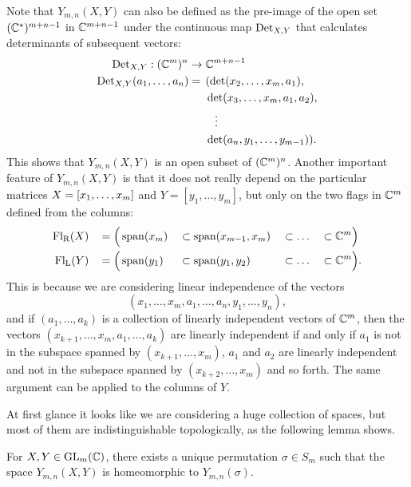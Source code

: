 Note that $Y_{m,n}(X,Y)$ can also be defined as the
pre-image of the open set $(\mathbb{C}^*)^{m+n-1}$ in $\mathbb{C}^{m+n-1}$ under the
continuous map $\operatorname{Det}_{X,Y}$ that calculates determinants of subsequent
vectors:
\begin{align*}
  \operatorname{Det}_{X,Y} : (\mathbb{C}^m)^n \to &\;\mathbb{C}^{m+n-1} \\
  \operatorname{Det}_{X,Y}(a_1,\dots,a_n) = \,&\; (\det(x_2,\dots,x_m,a_1),\\
  &\; \det(x_3,\dots,x_m,a_1,a_2), \\
  &\;\;\;\; \vdots\\
  &\; \det(a_n,y_1,\dots,y_{m-1})).
\end{align*}
This shows that $Y_{m,n}(X,Y)$ is an open subset of
$(\mathbb{C}^m)^n$. Another important
feature of $Y_{m,n}(X,Y)$ is that it does not really depend on the
particular matrices
$X =\nobreak [x_1,\dots,x_m]$ and $Y = [y_1,\dots,y_m]$,
but only on the two flags in $\mathbb{C}^{m}$ defined from the columns:
\begin{alignat*}{5}
  \mathrm{Fl_R}(X)\, &&= \Big(&\operatorname{span}(x_m) &&\subset \operatorname{span}(x_{m-1},x_m)
  &&\subset \dots &&\subset \mathbb{C}^m\Big) \\
  \mathrm{Fl_L}(Y)\, &&= \Big(&\operatorname{span}(y_1) &&\subset \operatorname{span}(y_1,y_2)
  &&\subset \dots &&\subset \mathbb{C}^m\Big).
\end{alignat*}
This is because we are considering linear independence of the vectors
\[ (x_1,\dots,x_m,a_1,\dots,a_n,y_1,\dots,y_n), \]
and if $(a_1,\dots,a_{k})$ is a collection of linearly independent
vectors of $\mathbb{C}^m$, then the vectors
$(x_{k+1},\dots,x_m,a_1,\dots,a_{k})$ are
linearly independent if and only if $a_1$ is not in the subspace
spanned by $(x_{k+1},\dots,x_m)$, $a_1$ and $a_2$ are linearly
independent and not in the
subspace spanned by $(x_{k+2},\dots,x_m)$ and so forth. The same
argument can be applied to the columns of $Y$.

At first glance it looks like we are considering a huge collection of
spaces, but most of them are indistinguishable topologically, as the
following lemma shows.

\begin{lemma} \label{lem:rum-perm}
  For $X,Y\in \operatorname{GL}_m(\mathbb{C})$, there exists a unique permutation $\sigma
  \in S_m$ such that the space
  $Y_{m,n}(X,Y)$ is homeomorphic to $Y_{m,n}(\sigma)$.
\end{lemma}

